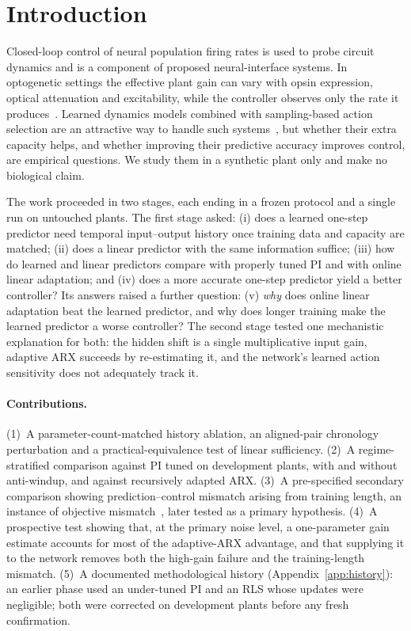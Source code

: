\documentclass[11pt]{article}
\begin{document}
\section{Introduction}
Closed-loop control of neural population firing rates is used to probe circuit dynamics and is a component of proposed neural-interface systems. In optogenetic settings the effective plant gain can vary with opsin expression, optical attenuation and excitability, while the controller observes only the rate it produces~\cite{newman2015}. Learned dynamics models combined with sampling-based action selection are an attractive way to handle such systems~\cite{nagabandi2018}, but whether their extra capacity helps, and whether improving their predictive accuracy improves control, are empirical questions. We study them in a synthetic plant only and make no biological claim.

The work proceeded in two stages, each ending in a frozen protocol and a single run on untouched plants. The first stage asked: (i) does a learned one-step predictor need temporal input--output history once training data and capacity are matched; (ii) does a linear predictor with the same information suffice; (iii) how do learned and linear predictors compare with properly tuned PI and with online linear adaptation; and (iv) does a more accurate one-step predictor yield a better controller? Its answers raised a further question: (v) \emph{why} does online linear adaptation beat the learned predictor, and why does longer training make the learned predictor a worse controller? The second stage tested one mechanistic explanation for both: the hidden shift is a single multiplicative input gain, adaptive ARX succeeds by re-estimating it, and the network's learned action sensitivity does not adequately track it.

\paragraph{Contributions.}
(1)~A parameter-count-matched history ablation, an aligned-pair chronology perturbation and a practical-equivalence test of linear sufficiency. (2)~A regime-stratified comparison against PI tuned on development plants, with and without anti-windup, and against recursively adapted ARX. (3)~A pre-specified secondary comparison showing prediction--control mismatch arising from training length, an instance of objective mismatch~\cite{lambert2020}, later tested as a primary hypothesis. (4)~A prospective test showing that, at the primary noise level, a one-parameter gain estimate accounts for most of the adaptive-ARX advantage, and that supplying it to the network removes both the high-gain failure and the training-length mismatch. (5)~A documented methodological history (Appendix~\ref{app:history}): an earlier phase used an under-tuned PI and an RLS whose updates were negligible; both were corrected on development plants before any fresh confirmation.
\end{document}

